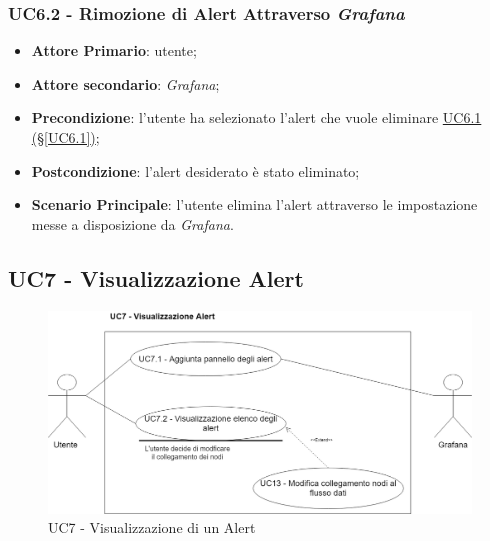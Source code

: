 \subsubsection{UC6.2 - Rimozione di Alert Attraverso \textit{Grafana}}\label{UC6.2}
\begin{itemize}
	\item \textbf{Attore Primario}: utente;
	\item \textbf{Attore secondario}: \textit{Grafana};
	\item \textbf{Precondizione}:  l'utente ha selezionato l'alert che vuole eliminare \hyperref[UC6.1]{UC6.1 (§\ref*{UC6.1})};
	\item \textbf{Postcondizione}: l'alert desiderato è stato eliminato;
	\item \textbf{Scenario Principale}: l'utente elimina l'alert attraverso le impostazione messe a disposizione da \textit{Grafana}.
\end{itemize}

\pagebreak

\subsection{UC7 - Visualizzazione Alert}\label{UC7}

\begin{figure}[H]
	\centering
	\includegraphics[scale=0.4]{./images/UC7.png}
	\caption{UC7 - Visualizzazione di un Alert}
\end{figure}

